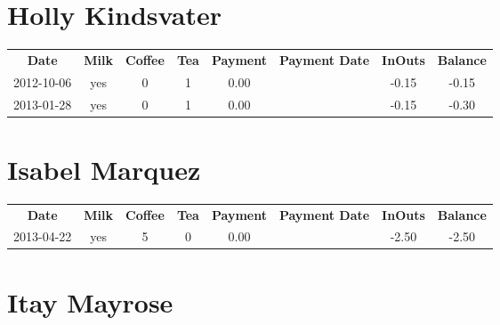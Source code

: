 \section{Holly Kindsvater}

\begin{center}
\begin{tabular}{cccccccc}
\textbf{Date} & \textbf{Milk} & \textbf{Coffee} & \textbf{Tea} & \textbf{Payment} & \textbf{Payment Date} & \textbf{InOuts} & \textbf{Balance} \\
2012-10-06 & yes & 0 & 1 & 0.00 &  & -0.15 & -0.15\\ 
2013-01-28 & yes & 0 & 1 & 0.00 &  & -0.15 & -0.30
\end{tabular}
\end{center}

\section{Isabel Marquez}

\begin{center}
\begin{tabular}{cccccccc}
\textbf{Date} & \textbf{Milk} & \textbf{Coffee} & \textbf{Tea} & \textbf{Payment} & \textbf{Payment Date} & \textbf{InOuts} & \textbf{Balance} \\
2013-04-22 & yes & 5 & 0 & 0.00 &  & -2.50 & -2.50
\end{tabular}
\end{center}

\section{Itay Mayrose}

